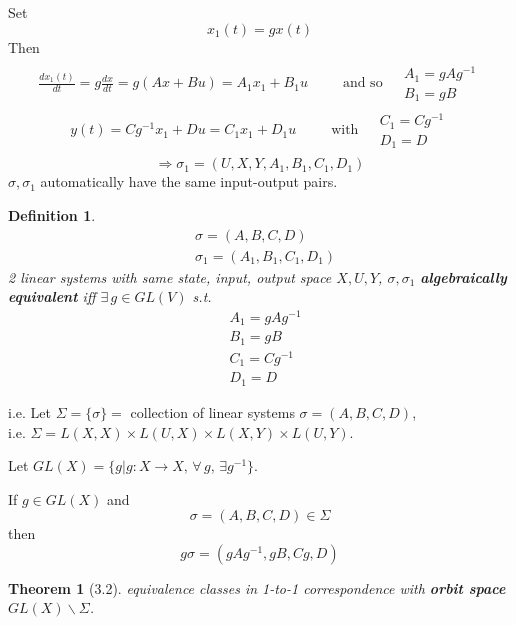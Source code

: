 \documentclass[10pt]{amsart}
\newtheorem{theorem}{Theorem}
\newtheorem{definition}{Definition}
\begin{document}
\begin{multicols*}{2}
Set 
\begin{equation}
	x_1(t) = gx(t) 
\end{equation}
Then
\[
\begin{gathered}
	\begin{gathered}
	\frac{dx_1(t)}{dt} = g\frac{dx}{dt} = g(Ax+Bu) = A_1x_1 + B_1u  \qquad \, \text{ and so }  \begin{aligned} & A_1 = gAg^{-1}  \\
& B_1= gB \end{aligned} 
\end{gathered}
\begin{gathered}
y(t) = Cg^{-1}x_1 + Du = C_1x_1 + D_1 u \qquad \, \text{ with } \begin{aligned} & C_1 = Cg^{-1} \\ 
& D_1 = D \end{aligned}
\end{gathered}
\end{gathered}
\]
\[
\Longrightarrow \sigma_1 = (U,X,Y,A_1 ,B_1, C_1,D_1) 
\]
$\sigma,\sigma_1$ automatically have the same input-output pairs.  

\begin{definition}
\begin{equation}	\begin{aligned} 
	& \sigma = (A,B,C,D) \\
	& \sigma_1 = (A_1,B_1,C_1,D_1) \end{aligned}
\end{equation}  2 linear systems with same state, input, output space $X,U,Y$, 
$\sigma,\sigma_1$ \textbf{ algebraically equivalent  } iff $\exists \, g \in GL(V)$ s.t. 
\begin{equation}
\begin{aligned}
& A_1 = gAg^{-1} \\ 
& B_1 = gB \\ 
& C_1 = Cg^{-1} \\ 
& D_1 = D
\end{aligned}
\end{equation}
\end{definition}
i.e. Let $\Sigma = \lbrace \sigma \rbrace =$ collection of linear systems $\sigma = (A,B,C,D)$, \\
i.e. $\Sigma = L(X,X) \times L(U,X) \times L(X,Y) \times L(U,Y)$.  

Let $GL(X) = \lbrace g|g:X\to X, \, \forall \, g, \, \exists g^{-1} \rbrace$.  

If $g\in GL(X)$ and 
\[
\sigma = (A,B,C,D) \in \Sigma
\]
then 
\[
g\sigma = (gAg^{-1}, gB,Cg, D)
\]
\begin{theorem}[3.2] 
	equivalence classes in 1-to-1 correspondence with \textbf{orbit space } $GL(X) \backslash \Sigma$.  
\end{theorem}


\end{multicols*}
\end{document}
